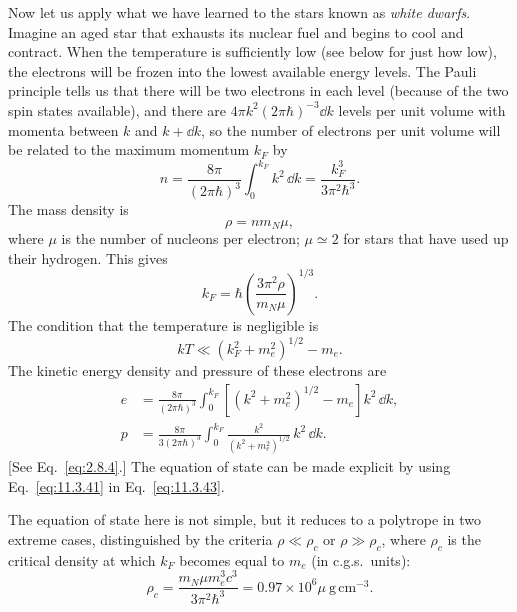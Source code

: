 Now let us apply what we have learned to the stars known as \emph{white
dwarfs}. Imagine an aged star that exhausts its nuclear fuel and begins to
cool and contract. When the temperature is sufficiently low (see below for
just how low), the electrons will be frozen into the lowest available energy
levels. The Pauli principle tells us that there will be two electrons in each
level (because of the two spin states available), and there are
\(4\pi k^2(2\pi\hbar)^{-3}\dd k\) levels per unit volume with momenta between
\(k\) and \(k+\dd k\), so the number of electrons per unit volume will be related
to the maximum momentum \(k_F\) by
\begin{equation}
  n
  =
  \frac{8\pi}{(2\pi\hbar)^3}\int_0^{k_F}k^2\,\dd k
  =
  \frac{k_F^3}{3\pi^2\hbar^3}.
  \tag{11.3.39}\label{eq:11.3.39}
\end{equation}
The mass density is
\begin{equation}
  \rho=nm_N\mu,
  \tag{11.3.40}\label{eq:11.3.40}
\end{equation}
where \(\mu\) is the number of nucleons per electron; \(\mu\simeq2\) for stars
that have used up their hydrogen. This gives
\begin{equation}
  k_F=\hbar\left(\frac{3\pi^2\rho}{m_N\mu}\right)^{1/3}.
  \tag{11.3.41}\label{eq:11.3.41}
\end{equation}
The condition that the temperature is negligible is
\[
  kT\ll\left(k_F^2+m_e^2\right)^{1/2}-m_e.
\]
The kinetic energy density and pressure of these electrons are
\begin{align}
  e
  &=
  \frac{8\pi}{(2\pi\hbar)^3}
  \int_0^{k_F}
  \left[\left(k^2+m_e^2\right)^{1/2}-m_e\right]k^2\,\dd k,
  \tag{11.3.42}\label{eq:11.3.42}\\
  p
  &=
  \frac{8\pi}{3(2\pi\hbar)^3}
  \int_0^{k_F}
  \frac{k^2}{(k^2+m_e^2)^{1/2}}\,k^2\,\dd k.
  \tag{11.3.43}\label{eq:11.3.43}
\end{align}
[See Eq.~\eqref{eq:2.8.4}.] The equation of state can be made explicit by
using Eq.~\eqref{eq:11.3.41} in Eq.~\eqref{eq:11.3.43}.

The equation of state here is not simple, but it reduces to a polytrope in two
extreme cases, distinguished by the criteria \(\rho\ll\rho_c\) or
\(\rho\gg\rho_c\), where \(\rho_c\) is the critical density at which \(k_F\)
becomes equal to \(m_e\) (in c.g.s.\ units):
\begin{equation}
  \rho_c
  =
  \frac{m_N\mu m_e^3c^3}{3\pi^2\hbar^3}
  =
  0.97\times10^6\mu\ \mathrm{g\,cm^{-3}}.
  \tag{11.3.44}\label{eq:11.3.44}
\end{equation}

